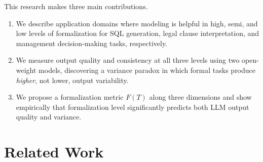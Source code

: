 \documentclass[runningheads]{llncs}
\begin{document}
This research makes three main contributions.
\begin{enumerate}[noitemsep]
  \item We describe application domains where modeling is helpful in high, semi, and low levels of formalization for SQL generation, legal clause interpretation, and management decision-making tasks, respectively.
  
  \item We measure output quality and consistency
  at all three levels using two open-weight models,
  discovering a variance paradox in which formal tasks produce \emph{higher}, not lower, output variability.

  \item We propose a formalization metric
  $F(T)$ along three dimensions and show empirically that formalization level significantly predicts both LLM output quality and variance.
\end{enumerate}
\fussy

\section{Related Work}
\label{sec:related}
\end{document}
